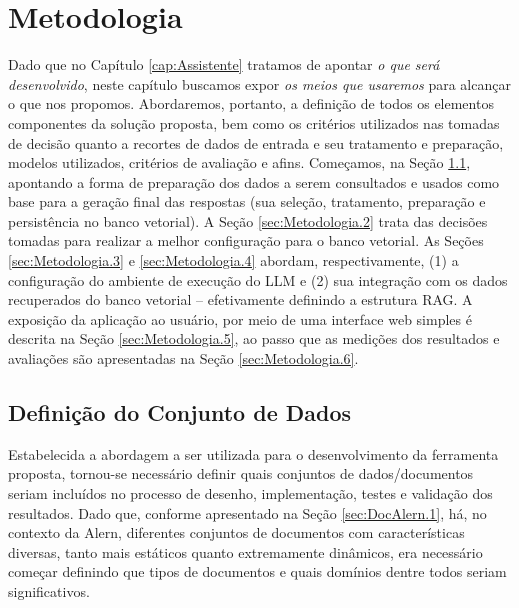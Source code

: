 \chapter{Metodologia}
\label{cap:Metodologia}

Dado que no Capítulo \ref{cap:Assistente} tratamos de apontar \textit{o que será desenvolvido}, neste capítulo buscamos expor \textit{os meios que usaremos} para alcançar o que nos propomos. Abordaremos, portanto, a definição de todos os elementos componentes da solução proposta, bem como os critérios utilizados nas tomadas de decisão quanto a recortes de dados de entrada e seu tratamento e preparação, modelos utilizados, critérios de avaliação e afins. Começamos, na Seção \ref{sec:Metodologia.1}, apontando a forma de preparação dos dados a serem consultados e usados como base para a geração final das respostas (sua seleção, tratamento, preparação e persistência no banco vetorial). A Seção \ref{sec:Metodologia.2} trata das decisões tomadas para realizar a melhor  configuração para o banco vetorial. As Seções \ref{sec:Metodologia.3} e \ref{sec:Metodologia.4} abordam, respectivamente, (1) a configuração do ambiente de execução do \ac{LLM} e (2) sua integração com os dados recuperados do banco vetorial -- efetivamente definindo a estrutura \ac{RAG}. A exposição da aplicação ao usuário, por meio de uma interface web simples é descrita na Seção \ref{sec:Metodologia.5}, ao passo que as medições dos resultados e avaliações são apresentadas na Seção \ref{sec:Metodologia.6}.

\section{Definição do Conjunto de Dados}
\label{sec:Metodologia.1}

Estabelecida a abordagem a ser utilizada para o desenvolvimento da ferramenta proposta, tornou-se necessário definir quais conjuntos de dados/documentos seriam incluídos no processo de desenho, implementação, testes e validação dos resultados. Dado que, conforme apresentado na Seção \ref{sec:DocAlern.1}, há, no contexto da \ac{Alern}, diferentes conjuntos de documentos com características diversas, tanto mais estáticos quanto extremamente dinâmicos, era necessário começar definindo que tipos de documentos e quais domínios dentre todos seriam significativos.

